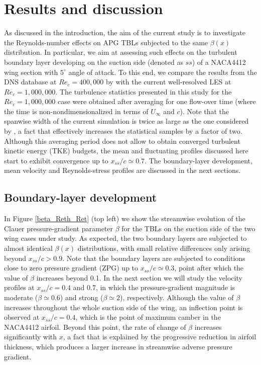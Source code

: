 \section{Results and discussion} 
  
As discussed in the introduction, the aim of the current study is to investigate the Reynolds-number effects on APG TBLs subjected to the same $\beta(x)$ distribution. In particular, we aim at assessing such effects on the turbulent boundary layer developing on the suction side (denoted as $ss$) of a NACA4412 wing section with $5^{\circ}$ angle of attack. To this end, we compare the results from the DNS database at $Re_{c}=400,000$ by \cite{hosseini_et_al} with the current well-resolved LES at $Re_{c}=1,000,000$. The turbulence statistics presented in this study for the $Re_{c}=1,000,000$ case were obtained after averaging for one flow-over time (where the time is non-nondimensionalized in terms of $U_{\infty}$ and $c$). Note that the spanwise width of the current simulation is twice as large as the one considered by \cite{hosseini_et_al}, a fact that effectively increases the statistical samples by a factor of two. Although this averaging period does not allow to obtain converged turbulent kinetic energy (TKE) budgets, the mean and fluctuating profiles discussed here start to exhibit convergence up to $x_{ss} /c \simeq 0.7$. The boundary-layer development, mean velocity and Reynolds-stress profiles are discussed in the next sections.

\subsection{Boundary-layer development}

In Figure \ref{beta_Reth_Ret} (top left) we show the streamwise evolution of the Clauer pressure-gradient parameter $\beta$ for the TBLs on the suction side of the two wing cases under study. As expected, the two boundary layers are subjected to almost identical $\beta(x)$ distributions, with small relative differences only arising beyond $x_{ss}/c > 0.9$. Note that the boundary layers are subjected to conditions close to zero pressure gradient (ZPG) up to $x_{ss}/c \simeq 0.3$, point after which the value of $\beta$ increases beyond 0.1. In the next section we will study the velocity profiles at $x_{ss}/c=0.4$ and 0.7, in which the pressure-gradient magnitude is moderate ($\beta \simeq 0.6$) and strong ($\beta \simeq 2$), respectively. Although the value of $\beta$ increases throughout the whole suction side of the wing, an inflection point is observed at $x_{ss}/c=0.4$, which is the point of maximum camber in the NACA4412 airfoil. Beyond this point, the rate of change of $\beta$ increases significantly with $x$, a fact that is explained by the progressive reduction in airfoil thickness, which produces a larger increase in streamwise adverse pressure gradient.

